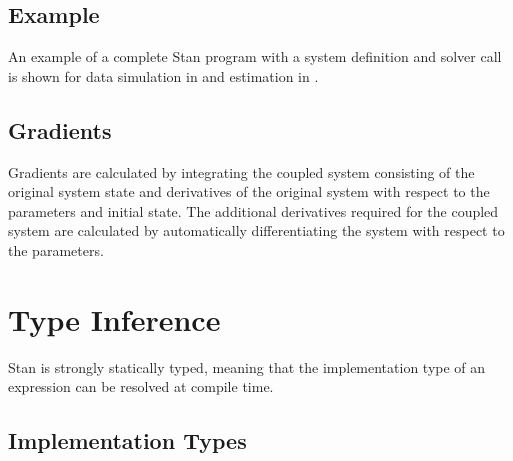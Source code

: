 \subsection{Example}

An example of a complete Stan program with a system definition and
solver call is shown for data simulation in  and
estimation in .

\subsection{Gradients}

Gradients are calculated by integrating the coupled system consisting
of the original system state and derivatives of the original system
with respect to the parameters and initial state.  The additional derivatives required
for the coupled system are calculated by automatically differentiating
the system with respect to the parameters.



\section{Type Inference}

Stan is strongly statically typed, meaning that the implementation
type of an expression can be resolved at compile time.

\subsection{Implementation Types}

